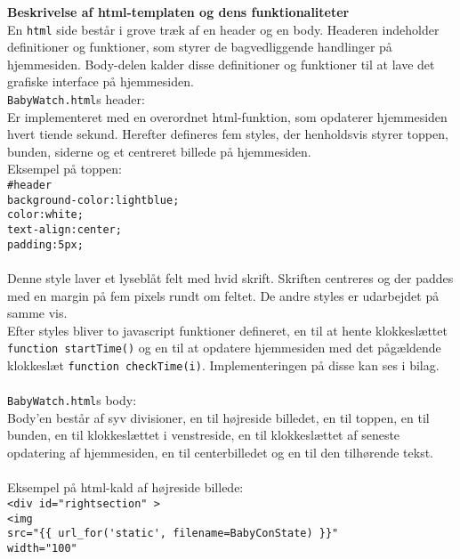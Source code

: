 \textbf{Beskrivelse af html-templaten og dens funktionaliteter} \\
En \verb+html+ side består i grove træk af en header og en body. Headeren indeholder definitioner og funktioner, som styrer de bagvedliggende handlinger på hjemmesiden. Body-delen kalder disse definitioner og funktioner til at lave det grafiske interface på hjemmesiden. 
\vspace{1mm} \\
\verb+BabyWatch.html+s header: \\ 
Er implementeret med en overordnet html-funktion, som opdaterer hjemmesiden hvert tiende sekund. Herefter defineres fem styles, der henholdsvis styrer toppen, bunden, siderne og et centreret billede på hjemmesiden. \\ Eksempel på toppen:  \\
\verb+#header+ \\
    \verb+background-color:lightblue;+\\
    \verb+color:white;+\\
    \verb+text-align:center;+\\
    \verb+padding:5px;+\\
\\Denne style laver et lyseblåt felt med hvid skrift. Skriften centreres og der paddes med en margin på fem pixels rundt om feltet. De andre styles er udarbejdet på samme vis.\\
Efter styles bliver to javascript funktioner defineret, en til at hente klokkeslættet \verb+function startTime()+ og en til at opdatere hjemmesiden med det pågældende klokkeslæt \verb+function checkTime(i)+. Implementeringen på disse kan ses i bilag.\vspace{2mm}\\
\\ \verb+BabyWatch.html+s body: \\ 
Body'en består af syv divisioner, en til højreside billedet, en til toppen, en til bunden, en til klokkeslættet i venstreside, en til klokkeslættet af seneste opdatering af hjemmesiden, en til centerbilledet og en til den tilhørende tekst.\\
\\Eksempel på html-kald af højreside billede: \\
\verb+<div id="rightsection" >+\\
\verb+<img +\\
\verb+src="{{ url_for('static', filename=BabyConState) }}"+\\
\verb+width="100"+\\
